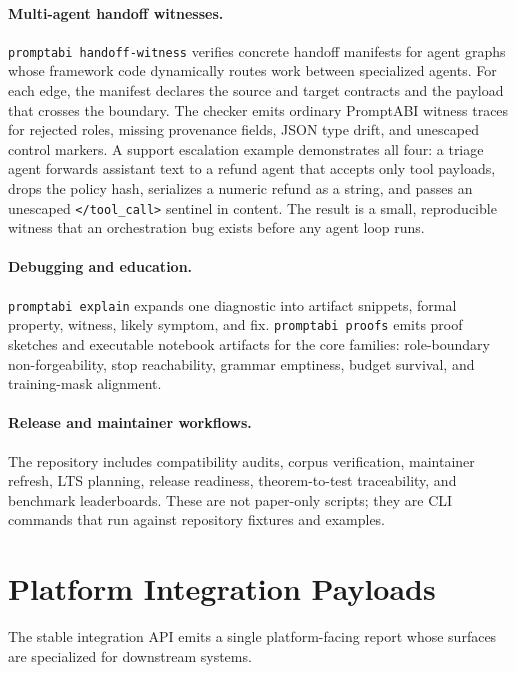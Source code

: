 \documentclass[10pt]{article}
\begin{document}
\paragraph{Multi-agent handoff witnesses.}
\texttt{promptabi handoff-witness} verifies concrete handoff manifests for agent
graphs whose framework code dynamically routes work between specialized agents.
For each edge, the manifest declares the source and target contracts and the
payload that crosses the boundary. The checker emits ordinary PromptABI witness
traces for rejected roles, missing provenance fields, JSON type drift, and
unescaped control markers. A support escalation example demonstrates all four:
a triage agent forwards assistant text to a refund agent that accepts only tool
payloads, drops the policy hash, serializes a numeric refund as a string, and
passes an unescaped \texttt{</tool\_call>} sentinel in content. The result is a
small, reproducible witness that an orchestration bug exists before any agent
loop runs.

\paragraph{Debugging and education.}
\texttt{promptabi explain} expands one diagnostic into artifact snippets,
formal property, witness, likely symptom, and fix. \texttt{promptabi proofs}
emits proof sketches and executable notebook artifacts for the core families:
role-boundary non-forgeability, stop reachability, grammar emptiness, budget
survival, and training-mask alignment.

\paragraph{Release and maintainer workflows.}
The repository includes compatibility audits, corpus verification, maintainer
refresh, LTS planning, release readiness, theorem-to-test traceability, and
benchmark leaderboards. These are not paper-only scripts; they are CLI commands
that run against repository fixtures and examples.

\newpage
\section{Platform Integration Payloads}

The stable integration API emits a single platform-facing report whose surfaces
are specialized for downstream systems.
\end{document}
